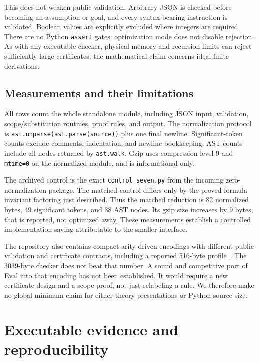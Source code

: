 \documentclass[11pt]{article}
\theoremstyle{definition}
\begin{document}
This does not weaken public validation. Arbitrary JSON is checked before
becoming an assumption or goal, and every syntax-bearing instruction is
validated. Boolean values are explicitly excluded where integers are
required. There are no Python \texttt{assert} gates: optimization mode
does not disable rejection. As with any executable checker, physical
memory and recursion limits can reject sufficiently large certificates;
the mathematical claim concerns ideal finite derivations.

\subsection{Measurements and their limitations}

All rows count the whole standalone module, including JSON input,
validation, scope/substitution routines, proof rules, and output. The
normalization protocol is \texttt{ast.unparse(ast.parse(source))} plus
one final newline. Significant-token counts exclude comments, indentation,
and newline bookkeeping. AST counts include all nodes returned by
\texttt{ast.walk}. Gzip uses compression level 9 and \texttt{mtime=0} on
the normalized module, and is informational only.

\begin{center}

\end{center}

The archived control is the exact \texttt{control\_seven.py} from the
incoming zero-normalization package. The matched control differs only
by the proved-formula invariant factoring just described. Thus the
matched reduction is 82 normalized bytes, 49 significant tokens, and
38 AST nodes. Its gzip size increases by 9 bytes; that is reported,
not optimized away. These measurements establish a controlled
implementation saving attributable to the smaller interface.

The repository also contains compact arity-driven encodings with
different public-validation and certificate contracts, including a
reported 516-byte profile~\cite{repo}. The 3039-byte checker does not beat
that number. A sound and competitive port of Eval into that encoding has
not been established. It would require a new certificate design and a
scope proof, not just relabeling a rule. We therefore make no global
minimum claim for either theory presentations or Python source size.

\section{Executable evidence and reproducibility}
\end{document}
